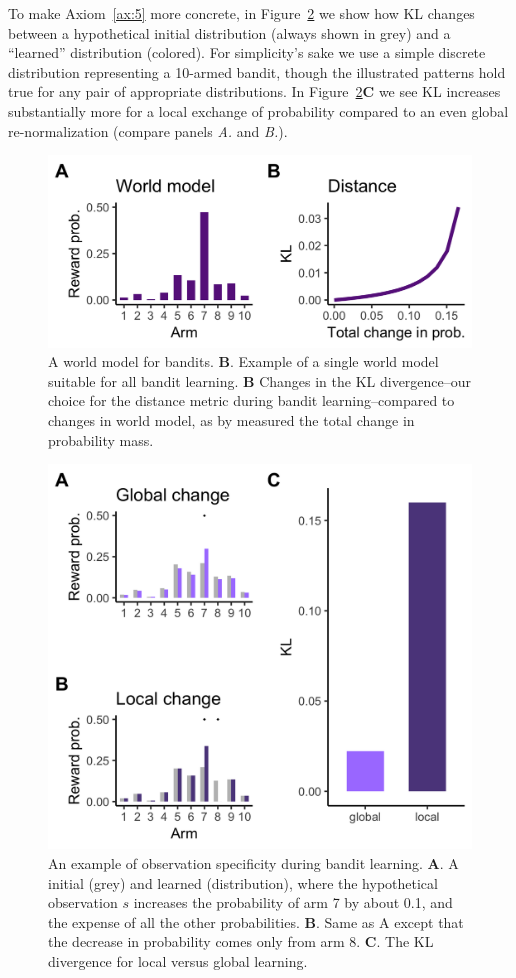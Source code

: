 To make Axiom~\ref{ax:5} more concrete, in Figure~\ref{fig:supf2} we show how KL changes between a hypothetical initial distribution (always shown in grey) and a ``learned'' distribution (colored). For simplicity's sake we use a simple discrete distribution representing a 10-armed bandit, though the illustrated patterns hold true for any pair of appropriate distributions. In Figure~\ref{fig:supf2}\textbf{C} we see KL increases substantially more for a local exchange of probability compared to an even global re-normalization (compare panels \textit{A.} and \textit{B.}). 

\begin{figure}
	[tbhp] \centering 
	\includegraphics[width=.6\linewidth]{figures/subfig1.png} 
	\caption{\label{fig:supf1} A world model for bandits.
	\textbf{B}. Example of a single world model suitable for all bandit learning.
	\textbf{B} Changes in the KL divergence--our choice for the distance metric during bandit learning--compared to changes in world model, as by measured the total change in probability mass.}
\end{figure}

\begin{figure}
	[tbhp] \centering 
	\includegraphics[width=.4\linewidth]{figures/subfig2.png} 
	\caption{\label{fig:supf2} An example of observation specificity during bandit learning. 
	\textbf{A}. A initial (grey) and learned (distribution), where the hypothetical observation $s$ increases the probability of arm 7 by about 0.1, and the expense of all the other probabilities.
	\textbf{B}. Same as A except that the decrease in probability comes only from arm 8.
	\textbf{C}. The KL divergence for local versus global learning.
	}
\end{figure}

